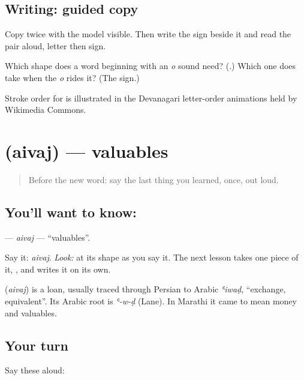 \subsection*{Writing: guided copy}

Copy \textbf{} twice with the model visible. Then write the \textbf{} sign beside it and read the pair aloud, letter then sign.

\begin{tcolorbox}[breakable,colback=teal!4,colframe=teal!35!black,title={Before you move on}]
Which shape does a word beginning with an \emph{o} sound need? (\textbf{}.) Which one does \textbf{} take when the \emph{o} rides it? (The \textbf{} sign.)

Stroke order for \textbf{} is illustrated in the Devanagari letter-order animations held by Wikimedia Commons.
\end{tcolorbox}
\section[\texorpdfstring{\mr{ऐवज} (aivaj)}{ऐवज (aivaj)}]{ (aivaj) — valuables}

\label{lesson:MR-C65-aivaj}



\begin{quote}
Before the new word: say the last thing you learned, once, out loud.
\end{quote}

\subsection*{You'll want to know: }
\textbf{} — \emph{aivaj} — \textquotedblleft{}valuables\textquotedblright{}.

Say it: \emph{aivaj}. \emph{Look:} at its shape as you say it. The next lesson takes one piece of it, \textbf{}, and writes it on its own.

\begin{cousinweb}
\textbf{} (\emph{aivaj}) is a loan, usually traced through Persian to Arabic \emph{ʿiwaḍ}, \textquotedblleft{}exchange, equivalent\textquotedblright{}. Its Arabic root is \emph{ʿ-w-ḍ} (Lane). In Marathi it came to mean money and valuables.
\end{cousinweb}

\subsection*{Your turn}
Say these aloud:

